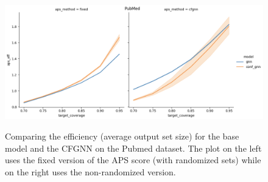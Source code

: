 \begin{figure}
    \centering
    \includegraphics[width=0.8\linewidth,alt={Preliminary results on effciency comparison with APS vs CFGNN.}]{graphConformal/figures/PubMed_CF.png}
    \caption{Comparing the efficiency (average output set size) for the base model and the CFGNN on the Pubmed dataset. The plot on the left uses the fixed version of the APS score (with randomized sets) while on the right uses the non-randomized version.}
    \label{fig:CFGNN:preliminary}
\end{figure}
